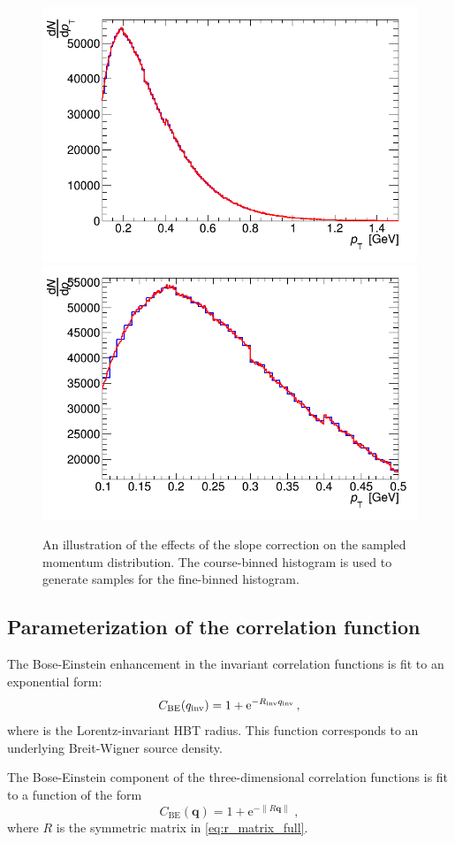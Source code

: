 \begin{figure}[htb]
\centering
\includegraphics[width=.49\linewidth]{testMomHistSampler.png}
\includegraphics[width=.49\linewidth]{testMomHistSamplerZoom.png}\\
\caption{An illustration of the effects of the \pt slope correction on the sampled momentum distribution. The course-binned histogram is used to generate samples for the fine-binned histogram.}
\label{fig:sample_slope_corr}
\end{figure}


\subsection{Parameterization of the correlation function}

The Bose-Einstein enhancement in the invariant correlation functions is fit to an exponential form:
\begin{equation} C_{\textrm{BE}}(q_{\mathrm{inv}}) = 1 + \mathrm{e}^{- R_{\mathrm{inv}} q_{\mathrm{inv}} } \,, \label{eq:cbe_qinv}\end{equation}
where \Rinv is the Lorentz-invariant HBT radius. This function corresponds to an underlying Breit-Wigner source density.

The Bose-Einstein component of the three-dimensional correlation functions is fit to a function of the form
\begin{equation}
C_{\textrm{BE}}(\mathbf{q}) = 1 + \mathrm{e}^{- \left\| R \mathbf{q} \right\|} \;, \label{eq:cbe_qosl}
\end{equation}
where $R$ is the symmetric matrix in \cref{eq:r_matrix_full}.


